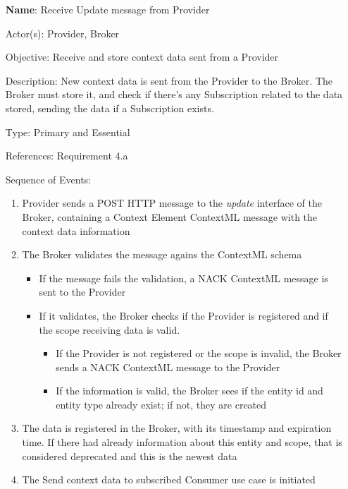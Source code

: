 \begin{itemize}
	\item[\textbf{Name}:] Receive Update message from Provider
	\item[Actor(s):] Provider, Broker
	\item[Objective:] Receive and store context data sent from a Provider
	\item[Description:] New context data is sent from the Provider to the Broker. The Broker must store it, and check if there's any Subscription related to the data stored, sending the data if a Subscription exists.
	\item[Type:] Primary and Essential
	\item[References:] Requirement 4.a
	\item[Sequence of Events:]\hfill
	\begin{enumerate}
		\item Provider sends a POST HTTP message to the \textit{update} interface of the Broker, containing a Context Element ContextML message with the context data information
		\item The Broker validates the message agains the ContextML schema
			\begin{itemize}
				\item If the message fails the validation, a NACK ContextML message is sent to the Provider
				\item If it validates, the Broker checks if the Provider is registered and if the scope receiving data is valid. 
				\begin{itemize}
					\item If the Provider is not registered or the scope is invalid, the Broker sends a NACK ContextML message to the Provider
					\item If the information is valid, the Broker sees if the entity id and entity type already exist; if not, they are created
				\end{itemize}
			\end{itemize}
			
			\item The data is registered in the Broker, with its timestamp and expiration time. If there had already information about this entity and scope, that is considered deprecated and this is the newest data
			\item The Send context data to subscribed Consumer use case is initiated
	\end{enumerate}
\end{itemize}

